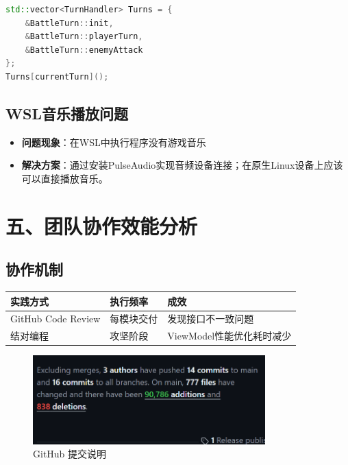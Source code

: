 \documentclass{article}
\begin{document}
\begin{lstlisting}[language=C++,basicstyle=\small\ttfamily]
std::vector<TurnHandler> Turns = {
    &BattleTurn::init,
    &BattleTurn::playerTurn,
    &BattleTurn::enemyAttack
};
Turns[currentTurn]();
\end{lstlisting}

\subsection{WSL音乐播放问题}
\begin{itemize}
    \item \textbf{问题现象}：在WSL中执行程序没有游戏音乐
    \item \textbf{解决方案}：通过安装PulseAudio实现音频设备连接；在原生Linux设备上应该可以直接播放音乐。
\end{itemize}

\section{五、团队协作效能分析}

\subsection{协作机制}
\begin{tabular}{lll}
\toprule
实践方式 & 执行频率 & 成效 \\
\midrule
GitHub Code Review & 每模块交付 & 发现接口不一致问题 \\
结对编程 & 攻坚阶段 & ViewModel性能优化耗时减少 \\
\bottomrule
\end{tabular}


\begin{figure}[h]
    \centering
    \includegraphics[width=0.8\textwidth]{figure/github.png}
    \caption{GitHub 提交说明}  %
    \label{fig:github}      %
\end{figure}
\end{document}
